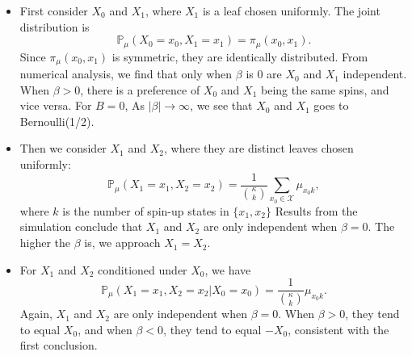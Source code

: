 \documentclass[12pt]{article}
\begin{document}
\begin{itemize}
    \item First consider $X_0$ and $X_1$, where $X_1$ is a leaf chosen uniformly. The joint distribution is
          \begin{equation*}
              \mathbb{P}_{\mu}(X_0=x_0, X_1=x_1) = \pi_\mu(x_0, x_1).
          \end{equation*}
          Since $\pi_\mu(x_0, x_1)$ is symmetric, they are identically distributed.
          From numerical analysis, we find that only when $\beta$ is $0$ are $X_0$ and $X_1$ independent.
          When $\beta > 0$, there is a preference of $X_0$ and $X_1$ being the same spins, and vice versa.
          For $B=0$, As $|\beta| \rightarrow \infty$, we see that $X_0$ and $X_1$ goes to Bernoulli(1/2).
    \item Then we consider $X_1$ and $X_2$, where they are distinct leaves chosen uniformly:
          \begin{equation*}
              \mathbb{P}_{\mu}(X_1=x_1, X_2=x_2) = \frac{1}{{\kappa \choose k}} \sum_{x_0\in\mathcal{X}} \mu_{x_0k} ,
          \end{equation*}
          where $k$ is the number of spin-up states in $\{x_1, x_2\}$
          Results from the simulation conclude that $X_1$ and $X_2$ are only independent when $\beta=0$. The higher the $\beta$
          is, we approach $X_1=X_2$.
    \item For $X_1$ and $X_2$ conditioned under $X_0$, we have
          \begin{equation*}
              \mathbb{P}_{\mu}(X_1=x_1, X_2=x_2 | X_0 = x_0) = \frac{1}{{\kappa \choose k}} \mu_{x_0k}.
          \end{equation*}
          Again, $X_1$ and $X_2$ are only independent when $\beta=0$. When $\beta>0$, they tend to equal $X_0$, and when $\beta<0$,
          they tend to equal $-X_0$, consistent with the first conclusion.
\end{itemize}
\end{document}

